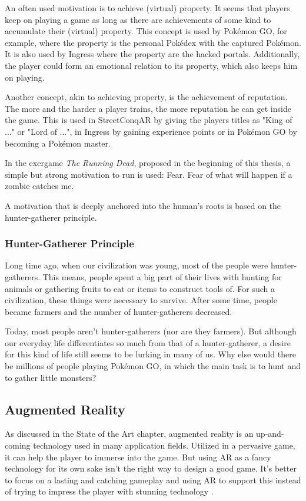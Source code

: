 An often used motivation is to achieve (virtual) property. It seems that players keep on playing a game as long as there are achievements of some kind to accumulate their (virtual) property. This concept is used by Pok\'{e}mon GO, for example, where the property is the personal Pok\'{e}dex with the captured Pok\'{e}mon. It is also used by Ingress where the property are the hacked portals. Additionally, the player could form an emotional relation to its property, which also keeps him on playing.

Another concept, akin to achieving property, is the achievement of reputation. The more and the harder a player trains, the more reputation he can get inside the game. This is used in StreetConqAR by giving the players titles as "King of ..." or "Lord of ...", in Ingress by gaining experience points or in Pok\'{e}mon GO by becoming a Pok\'{e}mon master.

In the exergame \emph{The Running Dead}, proposed in the beginning of this thesis, a simple but strong motivation to run is used: Fear. Fear of what will happen if a zombie catches me.

A motivation that is deeply anchored into the human's roots is based on the hunter-gatherer principle.

\subsubsection{Hunter-Gatherer Principle}
Long time ago, when our civilization was young, most of the people were hunter-gatherers. This means, people spent a big part of their lives with hunting for animals or gathering fruits to eat or items to construct tools of. For such a civilization, these things were necessary to survive. After some time, people became farmers and the number of hunter-gatherers decreased.

Today, most people aren't hunter-gatherers (nor are they farmers). But although our everyday life differentiates so much from that of a hunter-gatherer, a desire for this kind of life still seems to be lurking in many of us. Why else would there be millions of people playing Pok\'{e}mon GO, in which the main task is to hunt and to gather little monsters?

\subsection{Augmented Reality}
As discussed in the State of the Art chapter, augmented reality is an up-and-coming technology used in many application fields. Utilized in a pervasive game, it can help the player to immerse into the game. But using AR as a fancy technology for its own sake isn't the right way to design a good game. It's better to focus on a lasting and catching gameplay and using AR to support this instead of trying to impress the player with stunning technology \citep{wetzel2008guidelines}.

